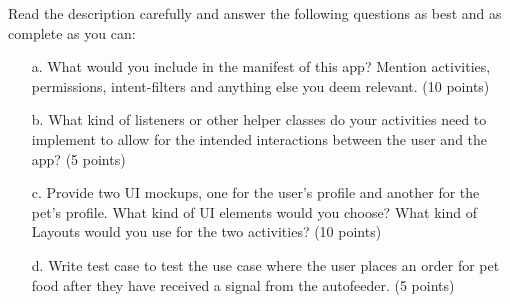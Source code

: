 \documentclass[12pt]{book}
\begin{document}
Read the description carefully and answer the following questions as best and as complete as you can:

\begin{itemize}
    \item[a.] What would you include in the manifest of this app? Mention activities, permissions, intent-filters and anything else you deem relevant. (10 points)
    

    \item[b.] What kind of listeners or other helper classes do your activities need to implement to allow for the intended interactions between the user and the app? (5 points)
    

    \item[c.] Provide two UI mockups, one for the user's profile and another for the pet's profile. What kind of UI elements would you choose? What kind of Layouts would you use for the two activities? (10 points)
    

    \item[d.] Write test case to test the use case where the user places an order for pet food after they have received a signal from the autofeeder. (5 points)
\end{itemize}
\end{document}
